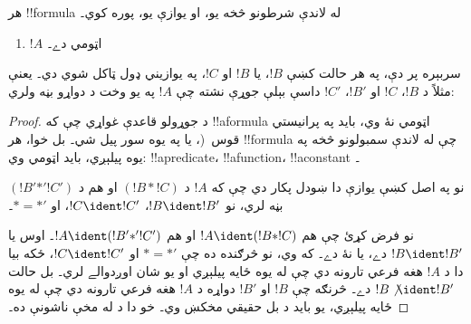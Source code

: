 \documentclass[../../../include/open-logic-section]{subfiles}
\begin{document}
\begin{prop}
هر !!{formula} له لاندې شرطونو څخه يو، او يوازې يو، پوره کوي۔
\begin{enumerate}
\item $!A$ اټومي دے۔







\end{enumerate}
سربېره پر دې، په هر حالت کښې $!B$، يا $!B$ او $!C$، په يوازيني ډول
ټاکل شوي دي۔ يعنې مثلاً د $!B$، $!C$ او $!B'$، $!C'$ داسې بېلې جوړې
نشته چې $!A$ په يو وخت د دواړو بڼه ولري:
\end{prop}

\begin{proof}
د جوړولو قاعدې غواړي چې که !!a{formula} اټومي نۀ وي، بايد په
پرانيستي قوس~(،  يا په يوه سور پيل شي۔ بل
خوا، هر !!{formula} چې له لاندې سمبولونو څخه په يوه پيلېږي، بايد
اټومي وي: !!a{predicate}، !!a{function}، !!a{constant}
۔

نو په اصل کښې يوازې دا ښودل پکار دي چې که $!A$ د $(!B \ast !C)$
او هم د $(!B' \mathbin{\ast'} !C')$ بڼه لري، نو $!B \ident !B'$،
$!C \ident !C'$، او $\ast = {\ast'}$۔

نو فرض کړئ چې هم $!A \ident (!B \ast !C)$ او هم $!A \ident (!B'
\mathbin{\ast'} !C')$۔ اوس يا $!B \ident !B'$ دے، يا نۀ دے۔ که وي،
نو څرګنده ده چې $\ast = {\ast'}$ او $!C \ident !C'$، ځکه بيا دا د
$!A$ هغه فرعي تارونه دي چې له يوه ځايه پيلېږي او يو شان اوږدوالے لري۔
بل حالت $!B \not\ident !B'$ دے۔ څرنګه چې $!B$ او $!B'$ دواړه د
$!A$ هغه فرعي تارونه دي چې له يوه ځايه پيلېږي، يو بايد د بل حقيقي
مخکښ وي۔ خو دا د  له مخې ناشونې ده۔
\end{proof}
\end{document}
